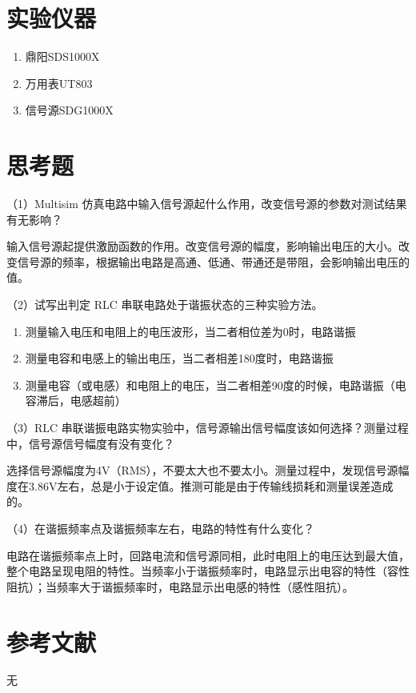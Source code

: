 \documentclass{ctexart}
\begin{document}
\section{实验仪器}
\begin{enumerate}
    \item 鼎阳SDS1000X
    \item 万用表UT803
    \item 信号源SDG1000X
\end{enumerate}
\section{思考题}
（1）Multisim 仿真电路中输入信号源起什么作用，改变信号源的参数对测试结果有无影响？

输入信号源起提供激励函数的作用。改变信号源的幅度，影响输出电压的大小。改变信号源的频率，根据输出电路是高通、低通、带通还是带阻，会影响输出电压的值。

（2）试写出判定 RLC 串联电路处于谐振状态的三种实验方法。

\begin{enumerate}
    \item 测量输入电压和电阻上的电压波形，当二者相位差为0时，电路谐振
    \item 测量电容和电感上的输出电压，当二者相差180度时，电路谐振
    \item 测量电容（或电感）和电阻上的电压，当二者相差90度的时候，电路谐振（电容滞后，电感超前）
\end{enumerate}
（3）RLC 串联谐振电路实物实验中，信号源输出信号幅度该如何选择？测量过程中，信号源信号幅度有没有变化？

选择信号源幅度为4V（RMS），不要太大也不要太小。测量过程中，发现信号源幅度在3.86V左右，总是小于设定值。推测可能是由于传输线损耗和测量误差造成的。

（4）在谐振频率点及谐振频率左右，电路的特性有什么变化？

电路在谐振频率点上时，回路电流和信号源同相，此时电阻上的电压达到最大值，整个电路呈现电阻的特性。当频率小于谐振频率时，电路显示出电容的特性（容性阻抗）；当频率大于谐振频率时，电路显示出电感的特性（感性阻抗）。

\section{参考文献}
无
\end{document}
